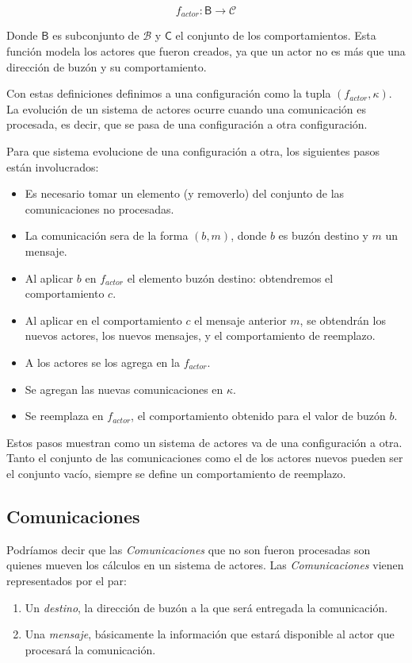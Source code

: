\[
f_{actor} : \mathsf{B} \rightarrow  \mathcal{C}
\]

Donde $\mathsf{B}$ es subconjunto de $\mathcal{B}$ y $\mathsf{C}$ el conjunto de los comportamientos. Esta función modela los actores que fueron creados, ya que un actor no es más que una dirección de buzón y su comportamiento.

Con estas definiciones definimos a una configuración como la tupla $(f_{actor}, \kappa)$. La evolución de un sistema de actores ocurre cuando una comunicación es procesada, es decir, que se pasa de una configuración a otra configuración.

Para que sistema evolucione de una configuración a otra, los siguientes pasos están involucrados:
\begin{itemize}
 \item Es necesario tomar un elemento (y removerlo) del conjunto de las comunicaciones no procesadas. 
 \item La comunicación sera de la forma $(b,m)$, donde $b$ es buzón destino y $m$ un mensaje. 
 \item Al aplicar $b$ en $f_{actor}$ el elemento buzón destino: obtendremos el comportamiento $c$. 
 \item Al aplicar en el comportamiento $c$ el mensaje anterior $m$, se obtendrán los nuevos actores, los nuevos mensajes, y el comportamiento de reemplazo.
 \item A los actores se los agrega en la $f_{actor}$. 
 \item Se agregan las nuevas comunicaciones en $\kappa$. 
 \item Se reemplaza en $f_{actor}$, el comportamiento obtenido para el valor de buzón $b$.
\end{itemize} 

Estos pasos muestran como un sistema de actores va de una configuración a otra. Tanto el conjunto de las comunicaciones como el de los actores nuevos pueden ser el conjunto vacío, siempre se define un comportamiento de reemplazo. 

\subsection{Comunicaciones}

Podríamos decir que las \textit{Comunicaciones} que no son fueron procesadas son quienes mueven los cálculos en un sistema de actores. Las \textit{Comunicaciones} vienen representados por el par:

\begin{enumerate}
\item Un \textit{destino}, la dirección de buzón a la que será entregada la comunicación. 
\item Una \textit{mensaje}, básicamente la información que estará disponible al actor que procesará la comunicación.
\end{enumerate}

